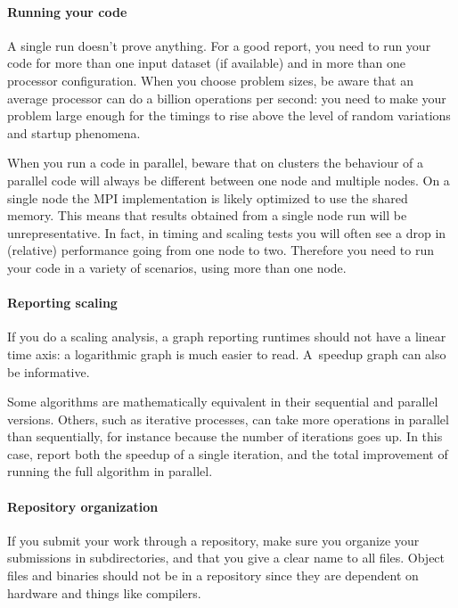 \paragraph*{\bf Running your code}

A single run doesn't prove anything. For a good report, you need to
run your code for more than one input dataset (if available) and in
more than one processor configuration. When you choose problem sizes,
be aware that an average processor can do a billion operations per
second: you need to make your problem large enough for the timings to
rise above the level of random variations and startup phenomena.

When you run a code in parallel, beware that on clusters the behaviour
of a parallel code will always be different between one node and
multiple nodes.  On a single node the MPI implementation is likely
optimized to use the shared memory. This means that results obtained
from a single node run will be unrepresentative. In fact, in timing
and scaling tests you will often see a drop in (relative) performance
going from one node to two.  Therefore you need to run your code in a
variety of scenarios, using more than one node.

\paragraph*{Reporting scaling}

If you do a scaling analysis, a graph reporting runtimes should not
have a linear time axis: a logarithmic graph is much easier to
read. A~speedup graph can also be informative.

Some algorithms are mathematically equivalent in their sequential and
parallel versions. Others, such as iterative processes, can take more
operations in parallel than sequentially, for instance because the
number of iterations goes up. In this case, report both the speedup of
a single iteration, and the total improvement of running the full
algorithm in parallel.

\paragraph*{Repository organization}

If you submit your work through a repository, make sure you organize
your submissions in subdirectories, and that you give a clear name to
all files. Object files and binaries should not be in a repository
since they are dependent on hardware and things like compilers.
